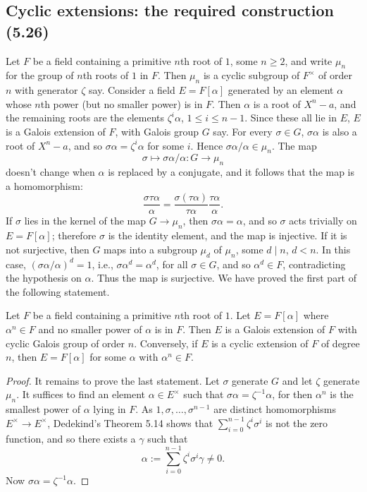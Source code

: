 \subsection*{Cyclic extensions: the required construction (5.26)}
Let $F$ be a field containing a primitive $n$th root of $1$, some $n\ge2$, and write $\mu_n$ for the group of $n$th roots of $1$ in $F$. Then $\mu_n$ is a cyclic subgroup of $F^\times$ of order $n$ with generator $\zeta$ say.
Consider a field $E=F[\alpha]$ generated by an element $\alpha$ whose $n$th power (but no smaller power) is in $F$. Then $\alpha$ is a root of $X^n-a$, and the remaining roots are the elements $\zeta^i\alpha$, $1\le i\le n-1$. Since these all lie in $E$, $E$ is a Galois extension of $F$, with Galois group $G$ say. For every $\sigma\in G$, $\sigma\alpha$ is also a root of $X^n-a$, and so $\sigma\alpha=\zeta^i\alpha$ for some $i$. Hence $\sigma\alpha/\alpha\in\mu_n$. The map
\[
\sigma\longmapsto\sigma\alpha/\alpha:G\longrightarrow\mu_n
\]
doesn't change when $\alpha$ is replaced by a conjugate, and it follows that the map is a homomorphism:
\[
\frac{\sigma\tau\alpha}{\alpha}
=\frac{\sigma(\tau\alpha)}{\tau\alpha}\frac{\tau\alpha}{\alpha}.
\]
If $\sigma$ lies in the kernel of the map $G\to\mu_n$, then $\sigma\alpha=\alpha$, and so $\sigma$ acts trivially on $E=F[\alpha]$; therefore $\sigma$ is the identity element, and the map is injective. If it is not surjective, then $G$ maps into a subgroup $\mu_d$ of $\mu_n$, some $d\mid n$, $d<n$. In this case, $(\sigma\alpha/\alpha)^d=1$, i.e., $\sigma\alpha^d=\alpha^d$, for all $\sigma\in G$, and so $\alpha^d\in F$, contradicting the hypothesis on $\alpha$. Thus the map is surjective. We have proved the first part of the following statement.
\begin{proposition}[5.26]
Let $F$ be a field containing a primitive $n$th root of $1$. Let $E=F[\alpha]$ where $\alpha^n\in F$ and no smaller power of $\alpha$ is in $F$. Then $E$ is a Galois extension of $F$ with cyclic Galois group of order $n$. Conversely, if $E$ is a cyclic extension of $F$ of degree $n$, then $E=F[\alpha]$ for some $\alpha$ with $\alpha^n\in F$.
\end{proposition}
\begin{proof}
It remains to prove the last statement. Let $\sigma$ generate $G$ and let $\zeta$ generate $\mu_n$. It suffices to find an element $\alpha\in E^\times$ such that $\sigma\alpha=\zeta^{-1}\alpha$, for then $\alpha^n$ is the smallest power of $\alpha$ lying in $F$. As $1,\sigma,\ldots,\sigma^{n-1}$ are distinct homomorphisms $E^\times\to E^\times$, Dedekind's Theorem 5.14 shows that $\sum_{i=0}^{n-1}\zeta^i\sigma^i$ is not the zero function, and so there exists a $\gamma$ such that
\[
\alpha\mathrel{:=}\sum_{i=0}^{n-1}\zeta^i\sigma^i\gamma\ne0.
\]
Now $\sigma\alpha=\zeta^{-1}\alpha$.
\end{proof}

